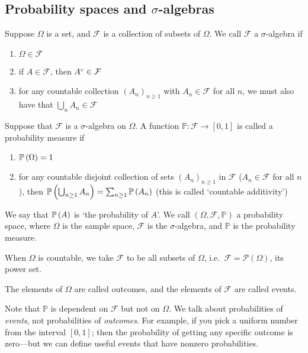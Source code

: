 \subsection{Probability spaces and \texorpdfstring{\(\sigma\)}{σ}-algebras}
\begin{definition}
	Suppose \(\Omega\) is a set, and \(\mathcal F\) is a collection of subsets of \(\Omega\).
	We call \(\mathcal F\) a \(\sigma\)-algebra if
	\begin{enumerate}
		\item \(\Omega \in \mathcal F\)
		\item if \(A \in \mathcal F\), then \({A}^c \in \mathcal F\)
		\item for any countable collection \((A_n)_{n \geq 1}\) with \(A_n \in \mathcal F\) for all \(n\), we must also have that \(\bigcup_n A_n \in \mathcal F\)
	\end{enumerate}
\end{definition}
\begin{definition}
	Suppose that \(\mathcal F\) is a \(\sigma\)-algebra on \(\Omega\).
	A function \(\mathbb P \colon \mathcal F \to [0, 1]\) is called a probability measure if
	\begin{enumerate}
		\item \(\mathbb{P}\left({\Omega}\right) = 1\)
		\item for any countable disjoint collection of sets \((A_n)_{n \geq 1}\) in \(\mathcal F\) (\(A_n \in \mathcal F\) for all \(n\)), then \(\mathbb{P}\left({\bigcup_{n \geq 1}A_n}\right) = \sum_{n \geq 1} \mathbb{P}\left({A_n}\right)\) (this is called `countable additivity')
	\end{enumerate}
	We say that \(\mathbb{P}\left({A}\right)\) is `the probability of \(A\)'.
	We call \((\Omega, \mathcal F, \mathbb P)\) a probability space, where \(\Omega\) is the sample space, \(\mathcal F\) is the \(\sigma\)-algebra, and \(\mathbb P\) is the probability measure.
\end{definition}

\begin{remark}
	When \(\Omega\) is countable, we take \(\mathcal F\) to be all subsets of \(\Omega\), i.e.\ \(\mathcal F = \mathcal P(\Omega)\), its power set.
\end{remark}
\begin{definition}
	The elements of \(\Omega\) are called outcomes, and the elements of \(\mathcal F\) are called events.
\end{definition}
Note that \(\mathbb P\) is dependent on \(\mathcal F\) but not on \(\Omega\).
We talk about probabilities of \textit{events}, not probabilities of \textit{outcomes}.
For example, if you pick a uniform number from the interval \([0, 1]\); then the probability of getting any specific outcome is zero---but we can define useful events that have nonzero probabilities.

